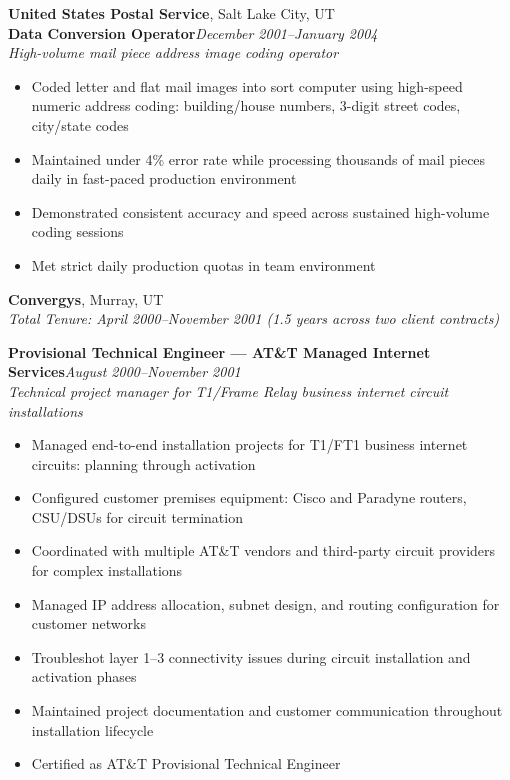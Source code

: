 \documentclass[9pt,letterpaper]{extarticle}
\begin{document}
\vspace{5pt}
\noindent\textbf{United States Postal Service}, Salt Lake City, UT\\
\textbf{Data Conversion Operator}\hfill\textit{December 2001--January 2004}\\
\textit{High-volume mail piece address image coding operator}
\begin{itemize}
  \item Coded letter and flat mail images into sort computer using high-speed numeric address coding: building/house numbers, 3-digit street codes, city/state codes
  \item Maintained under 4\% error rate while processing thousands of mail pieces daily in fast-paced production environment
  \item Demonstrated consistent accuracy and speed across sustained high-volume coding sessions
  \item Met strict daily production quotas in team environment
\end{itemize}

\vspace{5pt}
\noindent\textbf{Convergys}, Murray, UT\\
\textit{Total Tenure: April 2000--November 2001 (1.5 years across two client contracts)}

\smallskip\textbf{Provisional Technical Engineer --- AT\&T Managed Internet Services}\hfill\textit{August 2000--November 2001}\\
\textit{Technical project manager for T1/Frame Relay business internet circuit installations}
\begin{itemize}
  \item Managed end-to-end installation projects for T1/FT1 business internet circuits: planning through activation
  \item Configured customer premises equipment: Cisco and Paradyne routers, CSU/DSUs for circuit termination
  \item Coordinated with multiple AT\&T vendors and third-party circuit providers for complex installations
  \item Managed IP address allocation, subnet design, and routing configuration for customer networks
  \item Troubleshot layer 1--3 connectivity issues during circuit installation and activation phases
  \item Maintained project documentation and customer communication throughout installation lifecycle
  \item Certified as AT\&T Provisional Technical Engineer
\end{itemize}
\end{document}
